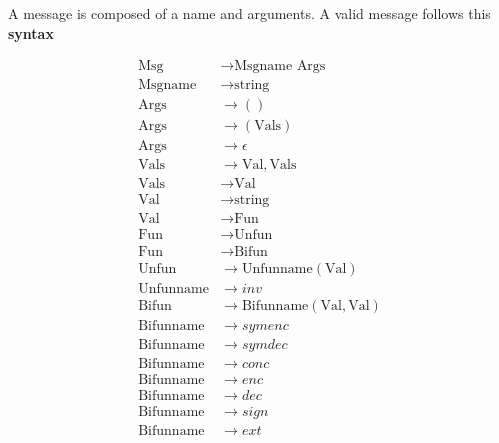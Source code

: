 \documentclass[12pt,journal,compsoc]{IEEEtran}
\begin{document}
A message is composed of a name and arguments. A valid message follows this \textbf{syntax}
%
\begin{small}
\begin{align*}
	\text{Msg} 			&\rightarrow \text{Msgname } \text{Args}				\\
	\text{Msgname}		&\rightarrow \text{string}				\\
	\text{Args}			&\rightarrow () 						\\
	\text{Args}			&\rightarrow  ( \text{Vals} )					\\
	\text{Args}			&\rightarrow \epsilon					\\
	\text{Vals}    		&\rightarrow \text{Val},\text{Vals}					\\
	\text{Vals}    		&\rightarrow \text{Val}						\\
	\text{Val}    		&\rightarrow \text{string}				\\
	\text{Val}    		&\rightarrow  \text{Fun}						\\
	\text{Fun}  			&\rightarrow \text{Unfun}						\\
	\text{Fun}  			&\rightarrow \text{Bifun}						\\
	\text{Unfun}			&\rightarrow \text{Unfunname} ( \text{Val} )			\\
	\text{Unfunname}		&\rightarrow inv						\\
	\text{Bifun}			&\rightarrow \text{Bifunname} ( \text{Val} , \text{Val} )		\\
	\text{Bifunname}		&\rightarrow symenc 					\\
	\text{Bifunname}		&\rightarrow symdec 					\\
	\text{Bifunname}		&\rightarrow conc 						\\
	\text{Bifunname}		&\rightarrow enc						\\
	\text{Bifunname}		&\rightarrow dec 						\\
	\text{Bifunname}		&\rightarrow sign						\\
	\text{Bifunname}		&\rightarrow ext		
\end{align*}
\end{small}
\end{document}
